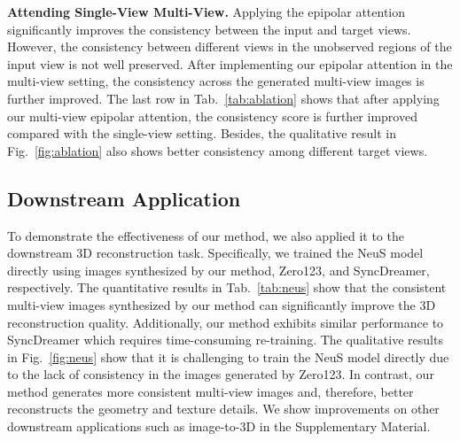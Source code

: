 \noindent \textbf{Attending Single-View \vs Multi-View.}
Applying the epipolar attention significantly improves the consistency between the input and target views. However, the consistency between different views in the unobserved regions of the input view is not well preserved.
After implementing our epipolar attention in the multi-view setting, the consistency across the generated multi-view images is further improved. The last row in Tab.~\ref{tab:ablation} shows that after applying our multi-view epipolar attention, the consistency score is further improved compared with the single-view setting. Besides, the qualitative result in Fig.~\ref{fig:ablation} also shows better consistency among different target views.




\vspace{-2mm}
\subsection{Downstream Application}
\vspace{-2mm}
To demonstrate the effectiveness of our method, we also applied it to the downstream 3D reconstruction task. Specifically, we trained the NeuS model~\cite{neus} directly using images synthesized by our method, Zero123, and SyncDreamer, respectively.
The quantitative results in Tab.~\ref{tab:neus} show that the consistent multi-view images synthesized by our method can significantly improve the 3D reconstruction quality.
Additionally, our method exhibits similar performance to SyncDreamer which requires time-consuming re-training.
The qualitative results in Fig.~\ref{fig:neus} show that it is challenging to train the NeuS model directly due to the lack of consistency in the images generated by Zero123. In contrast, our method generates more consistent multi-view images and, therefore, better reconstructs the geometry and texture details.
We show improvements on other downstream applications such as image-to-3D in the Supplementary Material.

